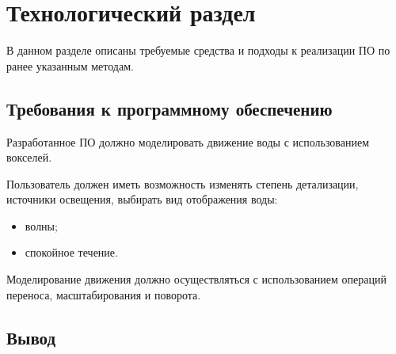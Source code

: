 \chapter{Технологический раздел}
\label{cha:impl}

В данном разделе описаны требуемые средства и подходы к реализации ПО по ранее указанным методам.


\section{Требования к программному обеспечению}

Разработанное ПО должно моделировать движение воды с использованием вокселей.

Пользователь должен иметь возможность изменять степень детализации,
источники освещения, выбирать вид отображения воды:
\begin{itemize}
    \item волны;
    \item спокойное течение.
\end{itemize}

Моделирование движения должно осуществляться с использованием операций переноса, масштабирования и поворота.

\section{Вывод}

